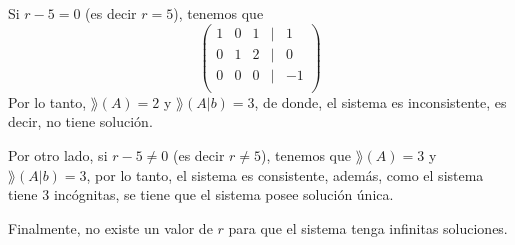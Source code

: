 \documentclass[11pt,respuestas,a4]{aleph-examen}
\begin{document}
\begin{preguntas}
\begin{respuesta}
Si $r-5=0$ (es decir $r=5$), tenemos que
\[
    \begin{pmatrix}
        1 & 0 & 1 & | & 1 \\
        0 & 1 & 2 & | & 0 \\
        0 & 0 & 0 & | & -1 \\
    \end{pmatrix}
\]
Por lo tanto, $\rang(A)=2$ y $\rang(A|b)=3$, de donde, el sistema es inconsistente, es decir, no tiene solución.

Por otro lado, si $r-5\neq0$ (es decir $r\neq5$), tenemos que $\rang(A)=3$ y $\rang(A|b)=3$, por lo tanto, el sistema es consistente, además, como el sistema tiene 3 incógnitas, se tiene que el sistema posee solución única. 

Finalmente, no existe un valor de $r$ para que el sistema tenga infinitas soluciones.
\end{respuesta}
\end{preguntas}
\end{document}
